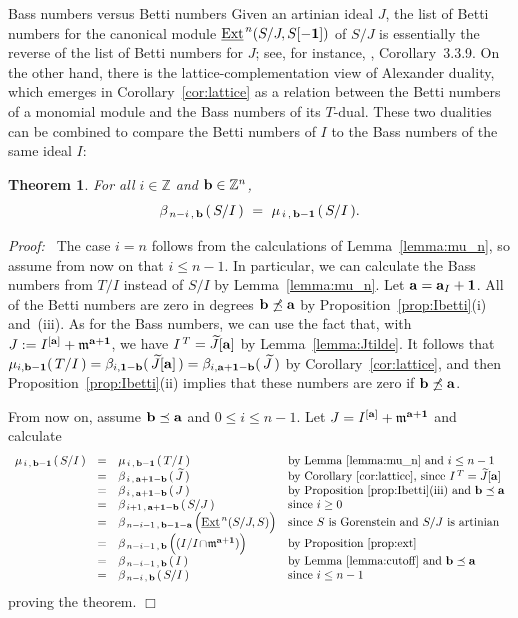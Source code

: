 \documentclass[12pt,leqno]{article}
\newtheorem{thm}{Theorem}[section]
\def\eext{{{\underline{\rm Ext}}{\scriptscriptstyle \,}}}
\def\aa{{{\rm \bf a}}}
\def\bb{{{\rm \bf b}}}
\def\mm{{\mathfrak m}}
\def\ZZ{{\mathbb Z}}
\begin{document}
\begin{section}{Bass numbers versus Betti numbers}
Given an artinian ideal $J$, the list of Betti numbers for the canonical
module $\eext^n(S/J,S[-{\bf 1}])$ of $S/J$ is essentially the reverse of
the list of Betti numbers for $J$; see, for instance, \cite{BH},
Corollary~3.3.9.  On the other hand, there is the lattice-complementation
view of Alexander duality, which emerges in Corollary~\ref{cor:lattice}
as a relation between the Betti numbers of a monomial module and the Bass
numbers of its $T$-dual.  These two dualities can be combined to compare
the Betti numbers of $I$ to the Bass numbers of the same ideal $I$:
\begin{thm} \label{thm:gor}
For all $i \in \ZZ$ and $\bb \in \ZZ^n$,
$$
	\beta_{\,n-i\,,\,\bb\,}(\,S/I\,)\ =\ 
	\mu_{\,i\,,\,\bb - {\bf 1}\,}(\,S/I\,).
$$
\end{thm}
{\it Proof:\ } The case $i = n$ follows from the calculations of
Lemma~\ref{lemma:mu_n}, so assume from now on that $i \leq n-1$.  In
particular, we can calculate the Bass numbers from $T/I$ instead of $S/I$
by Lemma~\ref{lemma:mu_n}.  Let $\aa = \aa_I + {\bf 1}$.  All of the
Betti numbers are zero in degrees $\bb \not\preceq \aa$ by
Proposition~\ref{prop:Ibetti}(i) and~(iii).  As for the Bass numbers, we
can use the fact that, with $J := I^{[\aa]} + \mm^{\aa + {\bf 1}}$, we
have $I^{\,T} = \widetilde{J}[\aa]$ by Lemma~\ref{lemma:Jtilde}.  It
follows that $\mu_{i,\bb - {\bf 1}}(\,T/I\,) = \beta_{i,{\bf 1} -
\bb}(\,\widetilde{J}[\aa]\,) = \beta_{i,\aa + {\bf 1} -
\bb}(\,\widetilde{J}\,)$ by Corollary~\ref{cor:lattice}, and then
Proposition~\ref{prop:Ibetti}(ii) implies that these numbers are zero if
$\bb \not\preceq \aa$.

{}From now on, assume $\bb \preceq \aa$ and $0 \leq i \leq n-1$.  Let $J =
I^{[\aa]} + \mm^{\aa + {\bf 1}}$ and calculate
$$
\begin{array}{rcll}
\mu_{\,i\,,\,\bb - {\bf 1}\,}(\,S/I\,)
& = &
	\mu_{\,i\,,\,\bb - {\bf 1}\,}(\,T/I\,)
&	\hbox{by Lemma~\ref{lemma:mu_n} and } i \leq n-1
\cr
& = &
	\beta_{\,i\,,\,\aa + {\bf 1} - \bb\,}(\,\widetilde{J}\,)
&	\hbox{by Corollary~\ref{cor:lattice}, since } I^{\,T} =
		\widetilde{J}[\aa]
\cr
& = &
	\beta_{\,i\,,\,\aa + {\bf 1} - \bb\,}(\,J\,)
&	\hbox{by Proposition~\ref{prop:Ibetti}(iii) and }\bb \preceq \aa
\cr
& = &	\beta_{\,i+1\,,\,\aa + {\bf 1} - \bb\,}(\,S/J\,)
&	{\rm since}\ i \geq 0
\cr
& = &
	\beta_{\,n-i-1\,,\,\bb - {\bf 1} - \aa\,}
		\Bigl(\eext^n(S/J,S)\Bigr) 
&	\hbox{since $S$ is Gorenstein and $S/J$ is artinian}
\cr
& = &
	\beta_{\,n-i-1\,,\,\bb\,}
		\Bigl((I/I\!\cap\!\mm^{\aa + {\bf 1}})\Bigr)
&	\hbox{by Proposition~\ref{prop:ext}}
\cr
& = &
	\beta_{\,n-i-1\,,\,\bb\,}(\,I\,)
&	\hbox{by Lemma~\ref{lemma:cutoff} and } \bb \preceq \aa
\cr
& = &
	\beta_{\,n-i\,,\,\bb\,}(\,S/I\,)
&	\hbox{since } i \leq n-1
\cr
\end{array}
$$
proving the theorem.
%
\hfill
$\Box$


\end{section}%
\end{document}

